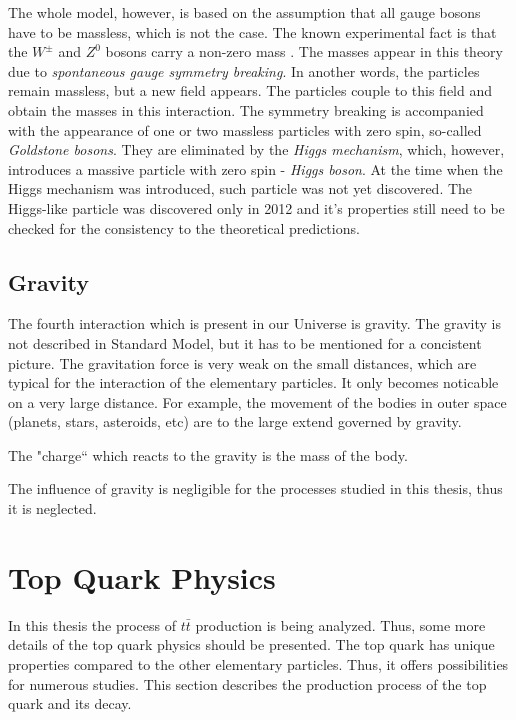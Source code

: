 The whole model, however, is based on the assumption that all gauge bosons have to be massless, which is not the case. The known experimental fact
is that the $W^{\pm}$ and $Z^{0}$ bosons carry a non-zero mass \cite{PDG-2012}. The masses appear in this theory due to \textit{spontaneous gauge symmetry
breaking}. In another words, the particles remain massless, but a new field appears. The particles couple to this field and obtain the masses in this
interaction. The symmetry breaking is accompanied with the appearance of one or two massless particles with zero spin, so-called \textit{Goldstone bosons}.
They are eliminated by the \textit{Higgs mechanism}, which, however, introduces a massive particle with zero spin - \textit{Higgs boson}. At the time when the
Higgs mechanism was introduced, such particle was not yet discovered. The Higgs-like particle was discovered only in 2012 \cite{Aad20121, Chatrchyan:2012xdj} 
and it's properties still need to be checked for the consistency to the theoretical predictions.


\subsection{Gravity}

The fourth interaction which is present in our Universe is gravity. The gravity is not described in Standard Model, but it has to be mentioned for a concistent 
picture. The gravitation force is very weak on the small distances, which are typical for the interaction of the elementary particles. It only becomes noticable
on a very large distance. For example, the movement of the bodies in outer space (planets, stars, asteroids, etc) are to the large extend governed by
gravity.

The "charge`` which reacts to the gravity is the mass of the body. 

The influence of gravity is negligible for the processes studied in this thesis, thus it is neglected.

\section{Top Quark Physics}

In this thesis the process of $t\bar{t}$ production is being analyzed. Thus, some more details of the top quark physics should be presented.
The top quark has unique properties compared to the other elementary particles. Thus, it offers possibilities for numerous studies. This
section describes the production process of the top quark and its decay.

